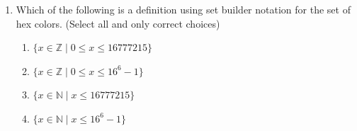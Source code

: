 \begin{enumerate}
\begin{enumerate}
    \item[] $255\cdot 256$
    \item[] $255\cdot 16^2$
    \item[] $65280$
    \end{enumerate}
\item Which of the following is a definition using set builder notation for the set of hex colors. (Select all and only correct choices)
    \begin{enumerate}
    \item[] $\{ x \in \mathbb{Z} \mid 0 \leq x \leq 16777215\}$
    \item[] $\{ x \in \mathbb{Z} \mid 0 \leq x \leq 16^6 -1\}$
    \item[] $\{ x \in \mathbb{N} \mid x \leq 16777215\}$
    \item[] $\{ x \in \mathbb{N} \mid x \leq 16^6 -1\}$
    \end{enumerate}
\end{enumerate}
